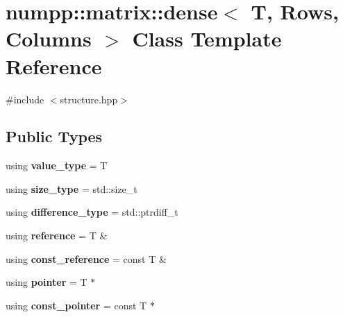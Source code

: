 \hypertarget{classnumpp_1_1matrix_1_1dense}{}\section{numpp\+:\+:matrix\+:\+:dense$<$ T, Rows, Columns $>$ Class Template Reference}
\label{classnumpp_1_1matrix_1_1dense}


{\ttfamily \#include $<$structure.\+hpp$>$}

\subsection*{Public Types}
\begin{DoxyCompactItemize}
\item 
\mbox{\label{classnumpp_1_1matrix_1_1dense_a460095662946aba4485ddff9fd9c9c25}} 
using {\bfseries value\+\_\+type} = T
\item 
\mbox{\label{classnumpp_1_1matrix_1_1dense_a8933da0e49a2b85f5d814e308f0b6f7d}} 
using {\bfseries size\+\_\+type} = std\+::size\+\_\+t
\item 
\mbox{\label{classnumpp_1_1matrix_1_1dense_a39ae02ee26477d867dedccd83d8ad9a5}} 
using {\bfseries difference\+\_\+type} = std\+::ptrdiff\+\_\+t
\item 
\mbox{\label{classnumpp_1_1matrix_1_1dense_ab341437bcc4946c78b724ed4759571c3}} 
using {\bfseries reference} = T \&
\item 
\mbox{\label{classnumpp_1_1matrix_1_1dense_a13cc8d63196c50e0d5ff0d5d3bc72216}} 
using {\bfseries const\+\_\+reference} = const T \&
\item 
\mbox{\label{classnumpp_1_1matrix_1_1dense_af5460c5096c0c2a4b8b2af82be785106}} 
using {\bfseries pointer} = T $\ast$
\item 
\mbox{\label{classnumpp_1_1matrix_1_1dense_a6ab2185898454a33e3435cbf9344b9b9}} 
using {\bfseries const\+\_\+pointer} = const T $\ast$
\end{DoxyCompactItemize}
